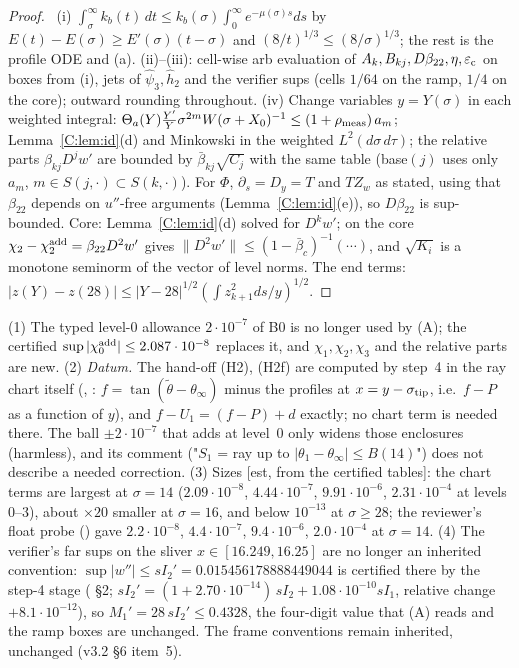 \begin{proof}\tP\ (i) $\int_\sigma^\infty k_b(t)\,dt\le k_b(\sigma)\int_0^\infty e^{-\mu(\sigma)s}ds$ by $E(t)-E(\sigma)\ge E'(\sigma)(t-\sigma)$ and $(8/t)^{1/3}\le(8/\sigma)^{1/3}$; the rest is the profile ODE and (a). (ii)--(iii): cell-wise arb evaluation of $A_k,B_{kj},D\beta_{22},\eta,\varepsilon_{\rm c}$ on boxes from (i),  jets of $\hat\psi_3,\hat h_2$ and the verifier sups (cells $1/64$ on the ramp, $1/4$ on the core); outward rounding throughout. (iv) Change variables $y=Y(\sigma)$ in each weighted integral: $\Theta_a(Y)\frac{Y'}{Y}\sigma^{2m}W(\sigma+X_0)^{-1}\le(1+\rho_{\rm meas})\,a_m$; Lemma~\ref{C:lem:id}(d) and Minkowski in the weighted $L^2(d\sigma\,d\tau)$; the relative parts $\beta_{kj}D^jw'$ are bounded by $\bar\beta_{kj}\sqrt{C_j}$ with the same table (base$(j)$ uses only $a_m$, $m\in S(j,\cdot)\subset S(k,\cdot)$). For $\Phi$, $\partial_s=D_y=T$ and $T Z_w$ as stated, using that $\beta_{22}$ depends on $u''$-free arguments (Lemma~\ref{C:lem:id}(e)), so $D\beta_{22}$ is sup-bounded. Core: Lemma~\ref{C:lem:id}(d) solved for $D^kw'$; on the core $\chi_2-\chi_2^{\rm add}=\beta_{22}D^2w'$ gives $\|D^2w'\|\le(1-\bar\beta_c)^{-1}(\cdots)$, and $\sqrt{K_i}$ is a monotone seminorm of the vector of level norms. The end terms: $|z(Y)-z(28)|\le|Y-28|^{1/2}(\int z_{k+1}^2ds/y)^{1/2}$.
\end{proof}

\begin{remark}\label{C:rem:chart}
(1) The typed level-0 allowance $2\cdot10^{-7}$ of B0 is no longer used by (A); the certified $\sup|\chi^{\rm add}_0|\le2.087\cdot10^{-8}$ replaces it, and $\chi_1,\chi_2,\chi_3$ and the relative parts are new.
(2) \emph{Datum.} The hand-off (H2), (H2f) are computed by step~4 in the ray chart itself (, : $f=\tan(\tilde\theta-\theta_\infty)$ minus the profiles at $x=y-\sigma_{\rm tip}$, i.e.\ $f-P$ as a function of $y$), and $f-U_1=(f-P)+d$ exactly; no chart term is needed there. The ball $\pm2\cdot10^{-7}$ that  adds at level~0 only widens those enclosures (harmless), and its comment ("$S_1$ = ray up to $|\theta_1-\theta_\infty|\le B(14)$") does not describe a needed correction.
(3) Sizes [est, from the certified tables]: the chart terms are largest at $\sigma=14$ ($2.09\cdot10^{-8}$, $4.44\cdot10^{-7}$, $9.91\cdot10^{-6}$, $2.31\cdot10^{-4}$ at levels $0$--$3$), about $\times20$ smaller at $\sigma=16$, and below $10^{-13}$ at $\sigma\ge28$; the reviewer's float probe () gave $2.2\cdot10^{-8}$, $4.4\cdot10^{-7}$, $9.4\cdot10^{-6}$, $2.0\cdot10^{-4}$ at $\sigma=14$.
(4) The verifier's far sups on the sliver $x\in[16.249,16.25]$ are no longer an inherited convention: $\sup|w''|\le sI_2'=0.015456178888449044$ is certified there by the step-4 stage  ( \S2; $sI_2'=(1+2.70\cdot10^{-14})\,sI_2+1.08\cdot10^{-10}sI_1$, relative change $+8.1\cdot10^{-12}$), so $M_1'=28\,sI_2'\le0.4328$, the four-digit value that (A) reads and the ramp boxes are unchanged. The frame conventions remain inherited, unchanged (v3.2 \S6 item~5).
\end{remark}
